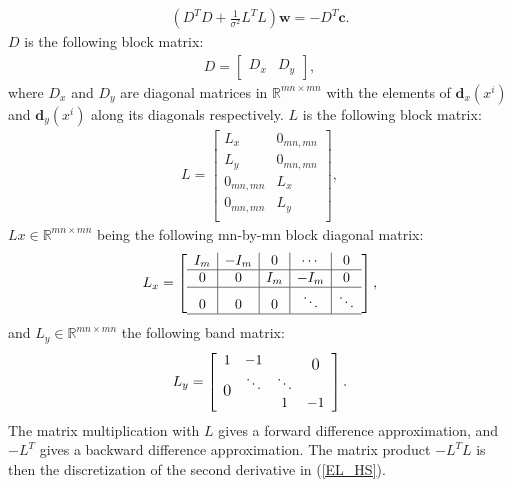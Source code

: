 \documentclass[10pt,a4paper]{article}
\newcommand\bigzero{\makebox(0,0){\text{\large 0}}}
\begin{document}
\begin{align}
(D^T D + \frac{1}{\sigma^2} L^TL) \textbf{w} = - D^T \textbf{c}.
\end{align}
$D$ is the following block matrix:
\begin{align*}
D = \left[
\begin{array}{c|c}
D_x & D_y
\end{array}
\right],
\end{align*}
where $D_x$ and $D_y$ are diagonal matrices in $\mathbb{R}^{mn \times mn}$ with the elements of $\textbf{d}_x(x^i)$ and $\textbf{d}_y(x^i)$ along its diagonals respectively. $L$ is the following block matrix:
\begin{align*}
L = \left[
\begin{array}{c|c}
L_x & 0_{mn,mn} \\
L_y & 0_{mn,mn} \\
0_{mn,mn} & L_x \\
0_{mn,mn} & L_y \\
\end{array}
\right],
\end{align*}
$Lx \in \mathbb{R}^{mn \times mn}$ being the following mn-by-mn block diagonal matrix:
\begin{align*}
L_x = \left[
\begin{array}{c|c|c|c|c}
I_{m} & -I_{m} & 0 & \cdots & 0 \\ \hline
0 & 0 & I_{m} & -I_{m} & 0 \\ \hline
0 & 0 & 0 & \ddots & \ddots \\ \hline
\end{array}
\right],
\end{align*}
and $L_y \in \mathbb{R}^{mn \times mn}$ the following band matrix:
\begin{align*}
L_y = \left[
\begin{array}{c c c c}
1 & -1 &  & \bigzero \\ 
 \bigzero & \ddots & \ddots &  \\
 &  & 1 & -1 \\
\end{array}
\right].
\end{align*}
The matrix multiplication with $L$ gives a forward difference approximation, and $-L^T$ gives a backward difference approximation. The matrix product $-L^TL$ is then the discretization of the second derivative in (\ref{EL_HS}).
\end{document}
